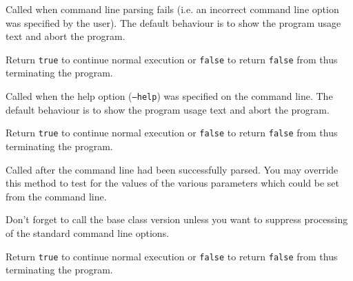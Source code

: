 

\label{wxapponcmdlineerror}


Called when command line parsing fails (i.e. an incorrect command line option
was specified by the user). The default behaviour is to show the program usage
text and abort the program.

Return {\tt true} to continue normal execution or {\tt false} to return 
{\tt false} from  thus terminating the program.




\label{wxapponcmdlinehelp}


Called when the help option ({\tt --help}) was specified on the command line.
The default behaviour is to show the program usage text and abort the program.

Return {\tt true} to continue normal execution or {\tt false} to return 
{\tt false} from  thus terminating the program.




\label{wxapponcmdlineparsed}


Called after the command line had been successfully parsed. You may override
this method to test for the values of the various parameters which could be
set from the command line.

Don't forget to call the base class version unless you want to suppress
processing of the standard command line options.

Return {\tt true} to continue normal execution or {\tt false} to return 
{\tt false} from  thus terminating the program.


